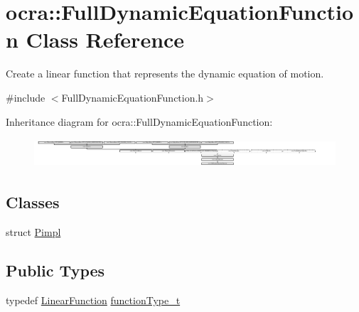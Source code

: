 \hypertarget{classocra_1_1FullDynamicEquationFunction}{}\section{ocra\+:\+:Full\+Dynamic\+Equation\+Function Class Reference}
\label{classocra_1_1FullDynamicEquationFunction}


Create a linear function that represents the dynamic equation of motion.  




{\ttfamily \#include $<$Full\+Dynamic\+Equation\+Function.\+h$>$}

Inheritance diagram for ocra\+:\+:Full\+Dynamic\+Equation\+Function\+:\begin{figure}[H]
\begin{center}
\leavevmode
\includegraphics[height=1.082126cm]{de/ddd/classocra_1_1FullDynamicEquationFunction}
\end{center}
\end{figure}
\subsection*{Classes}
\begin{DoxyCompactItemize}
\item 
struct \hyperlink{structFullDynamicEquationFunction_1_1Pimpl}{Pimpl}
\end{DoxyCompactItemize}
\subsection*{Public Types}
\begin{DoxyCompactItemize}
\item 
typedef \hyperlink{classocra_1_1LinearFunction}{Linear\+Function} \hyperlink{group__constraint_ga3f72eb3c4529d2c19ef39928f5e57262}{function\+Type\+\_\+t}
\end{DoxyCompactItemize}
